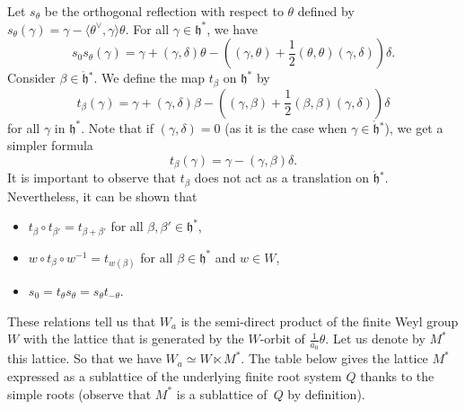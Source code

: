 \documentclass[10pt,a4paper]{amsart}
\numberwithin{equation}{section}
\newcommand{\ga}{\gamma}
\newcommand{\fh}{\mathfrak{h}}
\newcommand{\scal}[2]{\langle #1,#2\rangle}
\begin{document}
Let $s_\theta$ be the orthogonal reflection with respect to $\theta$ defined by $s_\theta(\ga) = \ga - \scal{\theta^\vee}{\ga}\theta$. For all $\ga\in \fh^\ast$, we have
\[
s_0s_{\theta}(\ga)= \gamma +(\ga,\delta)\theta - \left((\ga,\theta)+\frac{1}{2}(\theta,\theta)(\ga,\delta)\right)\delta.
\]
Consider $\beta\in \mathring{\fh}{}^\ast$. We define the map $t_\beta$ on $\fh^\ast$ by
\[
t_{\beta}(\gamma) = \gamma +(\gamma,\delta)\beta - \left((\gamma,\beta)+\frac{1}{2}(\beta,\beta)(\gamma,\delta)\right)\delta
\]
for all $\gamma$ in $\fh^\ast$.
Note that if $(\ga,\delta) = 0$ (as it is the case when $\ga\in \mathring{\fh}{}^\ast$), we get a simpler formula
\[
t_{\beta}(\gamma) = \gamma - (\gamma,\beta)\delta.
\]
It is important to observe that $t_{\beta}$ does not act as a translation on $\mathring{\fh}{}^\ast$.
Nevertheless, it can be shown that
\begin{itemize}\itemsep=0pt
\item  $t_\beta\circ t_{\beta'}=t_{\beta+\beta'}$ for all $\beta,\beta'\in \fh^\ast$,
\item  $w\circ t_{\beta} \circ w^{-1} = t_{w(\beta)}$ for all $\beta\in \fh^\ast$ and $w\in W$,
\item  $s_{0}=t_{\theta}s_{\theta}=s_{\theta}t_{-\theta}$.
\end{itemize}
These relations tell us that $W_a$ is the semi-direct product of the finite Weyl group $W$ with the lattice that is generated by the $W$-orbit of $\frac{1}{a_0}\theta$. Let us denote by $M^{*}$ this lattice. So that we have
$W_a\simeq W\ltimes M^{*}$.
The table below gives the lattice $M^{*}$ expressed as a sublattice of the underlying finite root system $Q$ thanks to the simple roots (observe that $M^{*}$ is a sublattice of~$Q$ by definition).
\end{document}
